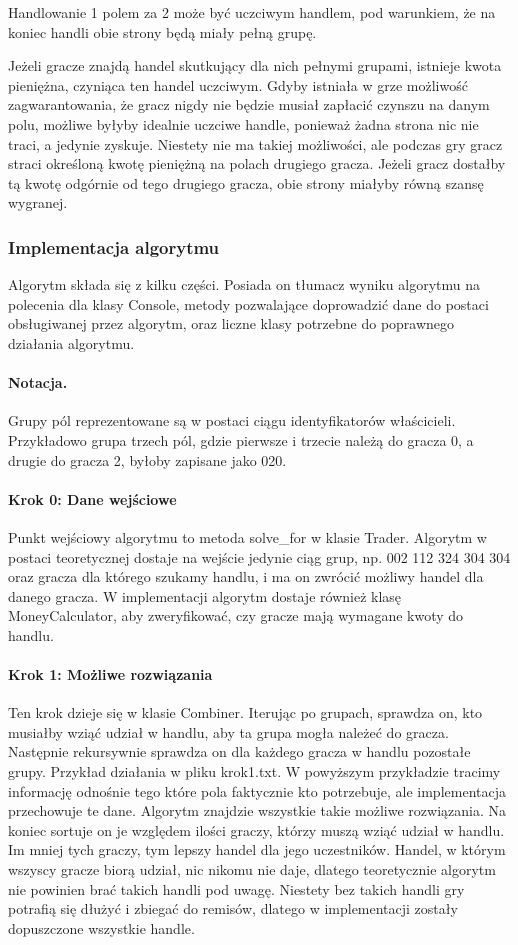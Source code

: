 \documentclass{article}
\begin{document}
Handlowanie 1 polem za 2 może być uczciwym handlem, pod warunkiem, że na koniec handli obie strony będą miały pełną grupę.

Jeżeli gracze znajdą handel skutkujący dla nich pełnymi grupami, istnieje kwota pieniężna, czyniąca ten handel uczciwym. Gdyby istniała w grze możliwość zagwarantowania, że gracz nigdy nie będzie musiał zapłacić czynszu na danym polu, możliwe byłyby idealnie uczciwe handle, ponieważ żadna strona nic nie traci, a jedynie zyskuje. Niestety nie ma takiej możliwości, ale podczas gry gracz straci określoną kwotę pieniężną na polach drugiego gracza. Jeżeli gracz dostałby tą kwotę odgórnie od tego drugiego gracza, obie strony miałyby równą szansę wygranej.

\subsubsection{Implementacja algorytmu}

Algorytm składa się z kilku części. Posiada on tłumacz wyniku algorytmu na polecenia dla klasy Console, metody pozwalające doprowadzić dane do postaci obsługiwanej przez algorytm, oraz liczne klasy potrzebne do poprawnego działania algorytmu.
\paragraph{Notacja.}
Grupy pól reprezentowane są w postaci ciągu identyfikatorów właścicieli. Przykładowo grupa trzech pól, gdzie pierwsze i trzecie należą do gracza 0, a drugie do gracza 2, byłoby zapisane jako 020.
\paragraph{Krok 0: Dane wejściowe}
Punkt wejściowy algorytmu to metoda solve\_for w klasie Trader. Algorytm w postaci teoretycznej dostaje na wejście jedynie ciąg grup, np. 002 112 324 304 304 oraz gracza dla którego szukamy handlu, i ma on zwrócić możliwy handel dla danego gracza. W implementacji algorytm dostaje również klasę MoneyCalculator, aby zweryfikować, czy gracze mają wymagane kwoty do handlu.
\paragraph{Krok 1: Możliwe rozwiązania}
Ten krok dzieje się w klasie Combiner. Iterując po grupach, sprawdza on, kto musiałby wziąć udział w handlu, aby ta grupa mogła należeć do gracza. Następnie rekursywnie sprawdza on dla każdego gracza w handlu pozostałe grupy.
Przykład działania w pliku krok1.txt.
W powyższym przykładzie tracimy informację odnośnie tego które pola faktycznie kto potrzebuje, ale implementacja przechowuje te dane. Algorytm znajdzie wszystkie takie możliwe rozwiązania. Na koniec sortuje on je względem ilości graczy, którzy muszą wziąć udział w handlu. Im mniej tych graczy, tym lepszy handel dla jego uczestników. Handel, w którym wszyscy gracze biorą udział, nic nikomu nie daje, dlatego teoretycznie algorytm nie powinien brać takich handli pod uwagę. Niestety bez takich handli gry potrafią się dłużyć i zbiegać do remisów, dlatego w implementacji zostały dopuszczone wszystkie handle.
\end{document}
